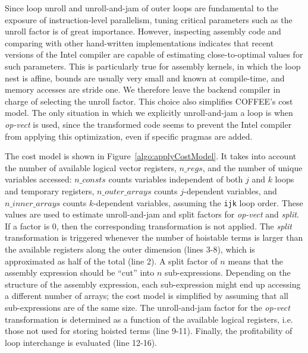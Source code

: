 \documentclass[conference]{IEEEtran}
\begin{document}
Since loop unroll and unroll-and-jam of outer loops are fundamental to the exposure of instruction-level parallelism, tuning critical parameters such as the unroll factor is of great importance. However, inspecting assembly code and comparing with other hand-written implementations indicates that recent versions of the Intel compiler are capable of estimating close-to-optimal values for such parameters. This is particularly true for assembly kernels, in which the loop nest is affine, bounds are usually very small and known at compile-time, and memory accesses are stride one. We therefore leave the backend compiler in charge of selecting the unroll factor. This choice also simplifies COFFEE's cost model. The only situation in which we explicitly unroll-and-jam a loop is when \emph{op-vect} is used, since the transformed code seems to prevent the Intel compiler from applying this optimization, even if specific pragmas are added. 


The cost model is shown in Figure~\ref{algo:applyCostModel}. It takes into account the number of available logical vector registers, $n\_regs$, and the number of unique variables accessed: $n\_consts$ counts variables independent of both $j$ and $k$ loops and temporary registers, $n\_outer\_arrays$ counts $j$-dependent variables, and $n\_inner\_arrays$ counts $k$-dependent variables, assuming the \texttt{ijk} loop order. These values are used to estimate unroll-and-jam and split factors for \emph{op-vect} and \emph{split}. If a factor is 0, then the corresponding transformation is not applied. The \emph{split} transformation is triggered whenever the number of hoistable terms is larger than the available registers along the outer dimension (lines 3-8), which is approximated as half of the total (line 2). A split factor of $n$ means that the assembly expression should be ``cut'' into $n$ sub-expressions. Depending on the structure of the assembly expression, each sub-expression might end up accessing a different number of arrays; the cost model is simplified by assuming that all sub-expressions are of the same size. The unroll-and-jam factor for the \emph{op-vect} transformation is determined as a function of the available logical registers, i.e. those not used for storing hoisted terms (line 9-11). Finally, the profitability of loop interchange is evaluated (line 12-16).
\end{document}
